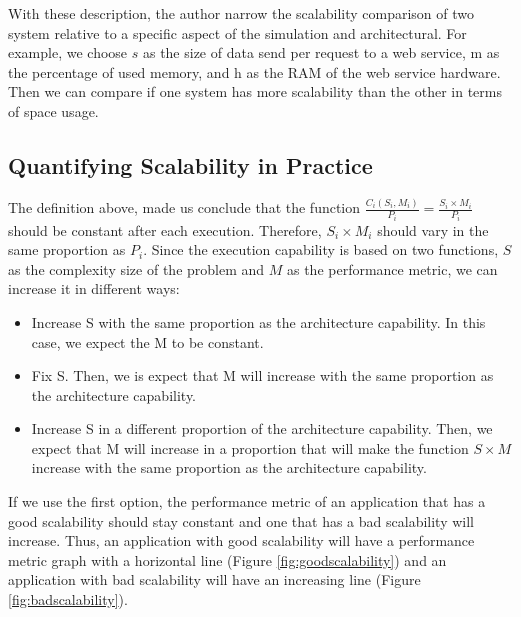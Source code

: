 With these description, the author narrow the scalability comparison of two system relative to a specific aspect of the simulation and architectural. For example, we choose $s$ as the size of data send per request to a web service, m as the percentage of used memory, and h as the RAM of the web service hardware. Then we can compare if one system has more scalability than the other in terms of space usage.

\subsection{Quantifying Scalability in Practice}

The definition above, made us conclude that the function $\frac{C_{i}(S_{i},M_{i})}{P_{i}} = \frac{S_{i} \times M_{i}}{P_{i}}$ should be constant after each execution. Therefore, $S_{i} \times M_{i}$ should vary in the same proportion as $P_{i}$. Since the execution capability is based on two functions, $S$ as the complexity size of the problem and $M$ as the performance metric, we can increase it in different ways:
\begin{itemize}
\item Increase S with the same proportion as the architecture capability. In this case, we expect the M to be constant.
\item Fix S. Then, we is expect that M will increase with the same proportion as the architecture capability.
\item Increase S in a different proportion of the architecture capability. Then, we expect that M will increase in a proportion that will make the function $S \times M$ increase with the same proportion as the architecture capability.
\end{itemize}

If we use the first option, the performance metric of an application that has a good scalability should stay constant and one that has a bad scalability will increase. Thus, an application with good scalability will have a performance metric graph with a horizontal line (Figure \ref{fig:goodscalability}) and an application with bad scalability will have an increasing line (Figure \ref{fig:badscalability}).

